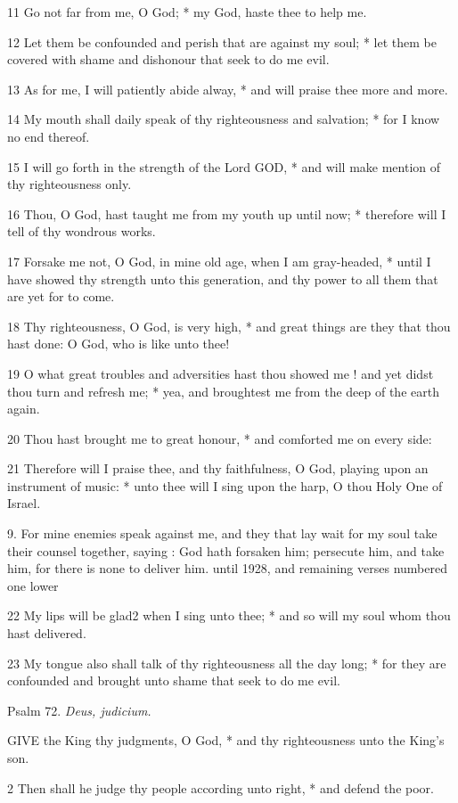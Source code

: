 11 Go not far from me, O God; * my God, haste thee to
help me.

12 Let them be confounded and perish that are against
my soul; * let them be covered with shame and dishonour that seek to do
me evil.

13 As for me, I will patiently abide alway, * and will
praise thee more and more.

14 My mouth shall daily speak of thy righteousness and
salvation; * for I know no end thereof.

15 I will go forth in the strength of the Lord GOD, * and will make mention of thy righteousness only.

16 Thou, O God, hast taught me from my youth up until
now; * therefore will I tell of thy wondrous works.

17 Forsake me not, O God, in mine old age, when I am
gray-headed, * until I have showed thy strength unto this generation, and
thy power to all them that are yet for to come.

18 Thy righteousness, O God, is very high, * and great
things are they that thou hast done: O God, who is like unto thee!

19 O what great troubles and adversities hast thou showed
me ! and yet didst thou turn and refresh me; * yea, and broughtest me from
the deep of the earth again.

20 Thou hast brought me to great honour, * and comforted
me on every side:

21 Therefore will I praise thee, and thy faithfulness,
O God, playing upon an instrument of music: * unto thee will I sing upon
the harp, O thou Holy One of Israel.

9. For mine enemies speak
against me, and they that lay wait for my soul take their counsel together,
saying : God hath forsaken him; persecute him, and take him, for there is
none to deliver him.
until 1928, and remaining verses numbered one lower

22 My lips will be glad2 when I sing unto thee; * and so will
my soul whom thou hast delivered.

23 My tongue also shall talk of thy righteousness all
the day long; * for they are confounded and brought unto shame that seek
to do me evil.

Psalm
72. \emph{Deus, judicium.}

GIVE
the King thy judgments, O God, * and thy righteousness unto the King's
son.

2 Then shall he judge thy people according unto right,
* and defend the poor.

